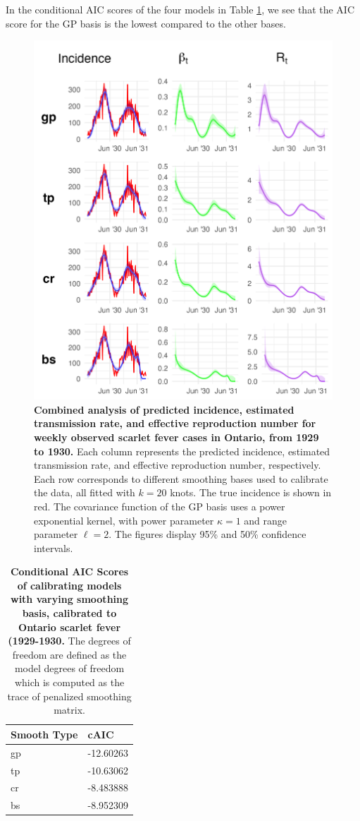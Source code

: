\documentclass[
11pt, %
oneside, %
english, %
singlespacing, %
]{macthesis} %
\begin{document}
In the conditional AIC scores of the four models in Table \ref{tab:aic-table-scarlet}, we see that the AIC score for the GP basis is the lowest compared to the other bases.

\begin{figure}[H]
\centering
\includegraphics[width=\textwidth, height = \textwidth]{figure/Scarlet/scarlet_combined.png}
\caption[Combined Analysis of Scarlet Fever (1929-1930)]{\textbf{Combined analysis of predicted incidence, estimated transmission rate, and effective reproduction number for weekly observed scarlet fever cases in Ontario, from 1929 to 1930.} Each column represents the predicted incidence, estimated transmission rate, and effective reproduction number, respectively. Each row corresponds to different smoothing bases used to calibrate the data, all fitted with \(k=20\) knots. The true incidence is shown in red. The covariance function of the GP basis uses a power exponential kernel, with power parameter \(\kappa = 1\) and range parameter \(\ell = 2\). The figures display 95\% and 50\% confidence intervals.}
\label{fig:scarlet_combined}
\end{figure}

\begin{table}[!h]
\centering
\caption{\label{tab:aic-table-scarlet}\textbf{Conditional AIC Scores of calibrating models with varying smoothing basis, calibrated to Ontario scarlet fever (1929-1930.} The degrees of freedom are defined as the model degrees of freedom which is computed as the trace of penalized smoothing matrix.}
\centering
\begin{tabular}[t]{ll}
\toprule
Smooth Type & cAIC\\
\midrule
gp & -12.60263\\
tp & -10.63062\\
cr & -8.483888\\
bs & -8.952309\\
\bottomrule
\end{tabular}
\end{table}
\end{document}
